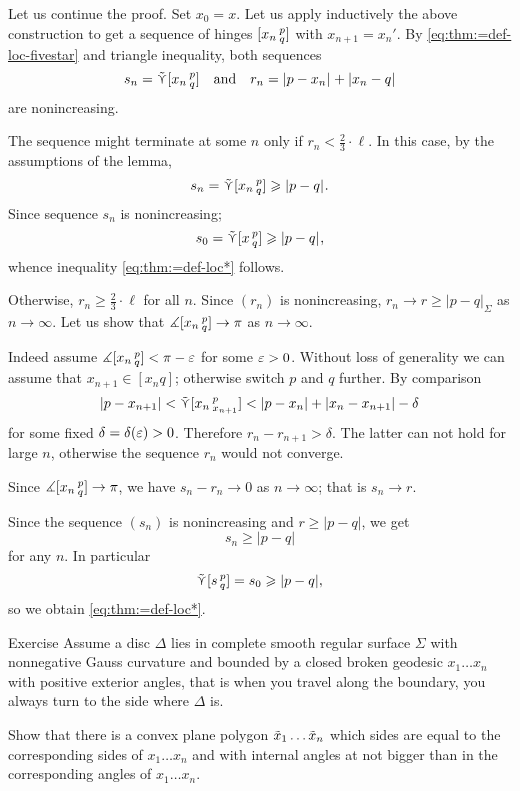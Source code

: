 Let us continue the proof.
Set $x_0=x$.
Let us apply inductively the above construction to get a sequence of hinges  $\hinge{x_n}p q$ with $x_{n+1}=x_n'$.
By \ref{eq:thm:=def-loc-fivestar} and triangle inequality, both sequences
\[s_n=\side \hinge{x_n}pq\quad\text{and}\quad r_n=\dist{p}{x_n}{}+\dist{x_n}{q}{}\]
are nonincreasing.

The sequence might terminate at some $n$ only if $r_n< \tfrac{2}{3}\cdot\ell $.
In this case, by the assumptions of the lemma, 
\[s_n=\side \hinge{x_n}p q\ge\dist{p}{q}{}.\]
Since sequence $s_n$ is nonincreasing;
\[s_0=\side \hinge{x}p q\ge\dist{p}{q}{},\]
whence inequality \ref{eq:thm:=def-loc*} follows.

Otherwise, $r_n\ge\tfrac{2}{3}\cdot\ell$ for all $n$.
Since $(r_n)$ is nonincreasing, $r_n\to r\ge |p-q|_\Sigma$ as $n\to\infty$.
Let us show that $\mangle\hinge{x_n}p q\to \pi$ as $n\to\infty$.

Indeed assume $\mangle\hinge{x_n}p q< \pi-\eps$ for some $\eps>0$.
Without loss of generality we can assume that $x_{n+1}\in [x_nq]$;
otherwise switch $p$ and $q$ further.
By comparison 
\[|p-x_{n+1}|<\side\hinge{x_n}p{x_{n+1}}<|p-x_n|+|x_n-x_{n+1}|-\delta\]
for some fixed $\delta=\delta(\eps)>0$.
Therefore $r_n-r_{n+1}>\delta$.
The latter can not hold for large $n$, otherwise the sequence $r_n$ would not converge.

Since $\mangle\hinge{x_n}p q\to \pi$, we have 
$s_n-r_n\to 0$ as $n\to\infty$;
that is $s_n\to r$.

Since the sequence $(s_n)$ is nonincreasing and $r\ge |p-q|$, we get
\[s_n\ge |p-q|\]
for any $n$.
In particular
\[\side\hinge spq=s_0\ge |p-q|,\] so we obtain \ref{eq:thm:=def-loc*}.
\qeds


\begin{thm}{Exercise} 
Assume a disc $\Delta$ lies in complete smooth regular surface $\Sigma$ with nonnegative Gauss curvature and bounded by a closed broken geodesic $x_1\dots x_n$ with positive exterior angles, that is when you travel along the boundary, you always turn to the side where $\Delta$ is.

Show that there is a convex plane polygon $\~x_1\dots \~x_n$ which sides are equal to the corresponding sides of $x_1\dots x_n$ and with internal angles at not bigger than in the corresponding angles  of $x_1\dots x_n$.
\end{thm}



